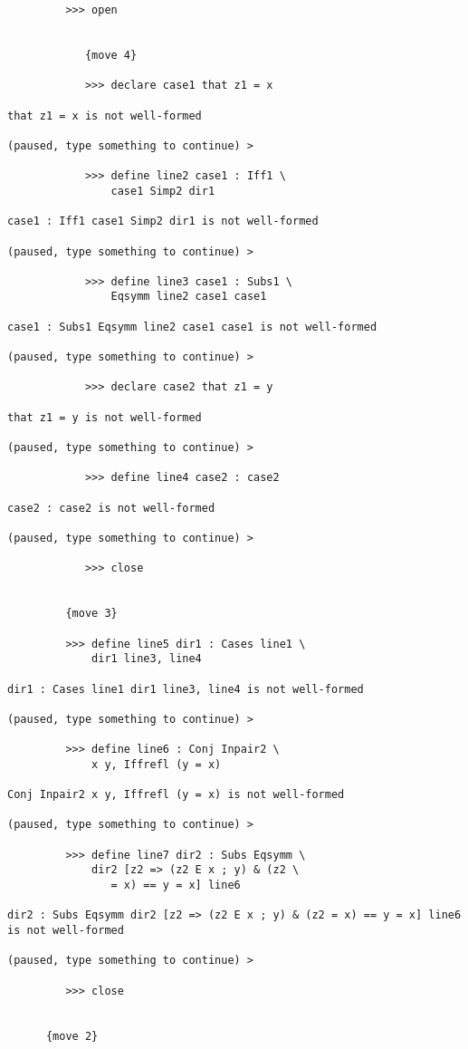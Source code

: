 \documentclass[12pt]{article}
\begin{document}
\begin{verbatim}
         >>> open


            {move 4}

            >>> declare case1 that z1 = x

that z1 = x is not well-formed

(paused, type something to continue) >

            >>> define line2 case1 : Iff1 \
                case1 Simp2 dir1

case1 : Iff1 case1 Simp2 dir1 is not well-formed

(paused, type something to continue) >

            >>> define line3 case1 : Subs1 \
                Eqsymm line2 case1 case1

case1 : Subs1 Eqsymm line2 case1 case1 is not well-formed

(paused, type something to continue) >

            >>> declare case2 that z1 = y

that z1 = y is not well-formed

(paused, type something to continue) >

            >>> define line4 case2 : case2

case2 : case2 is not well-formed

(paused, type something to continue) >

            >>> close


         {move 3}

         >>> define line5 dir1 : Cases line1 \
             dir1 line3, line4

dir1 : Cases line1 dir1 line3, line4 is not well-formed

(paused, type something to continue) >

         >>> define line6 : Conj Inpair2 \
             x y, Iffrefl (y = x)

Conj Inpair2 x y, Iffrefl (y = x) is not well-formed

(paused, type something to continue) >

         >>> define line7 dir2 : Subs Eqsymm \
             dir2 [z2 => (z2 E x ; y) & (z2 \
                = x) == y = x] line6

dir2 : Subs Eqsymm dir2 [z2 => (z2 E x ; y) & (z2 = x) == y = x] line6 is not well-formed

(paused, type something to continue) >

         >>> close


      {move 2}


\end{verbatim}
\end{document}
